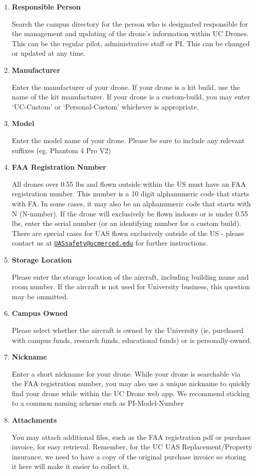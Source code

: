 \documentclass[
]{book}
\begin{document}
\begin{enumerate}
\def\labelenumi{\arabic{enumi}.}
\item
  \textbf{Responsible Person}

  Search the campus directory for the person who is designated responsible for the management and updating of the drone's information within UC Drones. This can be the regular pilot, administrative staff or PI. This can be changed or updated at any time.
\item
  \textbf{Manufacturer}

  Enter the manufacturer of your drone. If your drone is a kit build, use the name of the kit manufacturer. If your drone is a custom-build, you may enter `UC-Custom' or `Personal-Custom' whichever is appropriate.
\item
  \textbf{Model}

  Enter the model name of your drone. Please be sure to include any relevant suffixes (eg. Phantom 4 Pro V2)
\item
  \textbf{FAA Registration Number}

  All drones over 0.55 lbs and flown outside within the US must have an FAA registration number. This number is a 10 digit alphanumeric code that starts with FA. In some cases, it may also be an alphanumeric code that starts with N (N-number). If the drone will exclusively be flown indoors or is under 0.55 lbs, enter the serial number (or an identifying number for a custom build). There are special cases for UAS flown exclusively outside of the US - please contact us at \href{mailto:UASsafety@ucmerced.edu}{\nolinkurl{UASsafety@ucmerced.edu}} for further instructions.
\item
  \textbf{Storage Location}

  Please enter the storage location of the aircraft, including building name and room number. If the aircraft is not used for University business, this question may be ommitted.
\item
  \textbf{Campus Owned}

  Please select whether the aircraft is owned by the University (ie, purchased with campus funds, research funds, educational funds) or is personally-owned.
\item
  \textbf{Nickname}

  Enter a short nickname for your drone. While your drone is searchable via the FAA registration number, you may also use a unique nickname to quickly find your drone while within the UC Drone web app. We recommend sticking to a common naming scheme such as PI-Model-Number
\item
  \textbf{Attachments}

  You may attach additional files, such as the FAA registration pdf or purchase invoice, for easy retrieval. Remember, for the UC UAS Replacement/Property insurance, we need to have a copy of the original purchase invoice so storing it here will make it easier to collect it.
\end{enumerate}
\end{document}
